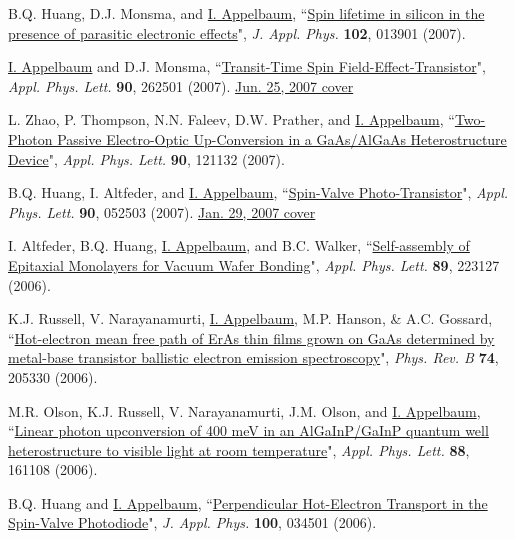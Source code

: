 \documentclass[paper=letter,fontsize=11pt]{scrartcl} %
\newcommand{\PaperEntry}[7]{
		\noindent #1, ``\href{#7}{#2}", \textit{#3} \textbf{#4}, #5 (#6).}
\begin{document}
\begin{etaremune}
\item\PaperEntry{B.Q. Huang, D.J. Monsma, and \underline{I. Appelbaum}}{Spin lifetime in silicon in the presence of parasitic electronic effects}{J. Appl. Phys.}{102}{013901}{2007}{http://dx.doi.org/10.1063/1.2750411}

\item\PaperEntry{\underline{I. Appelbaum} and D.J. Monsma}{Transit-Time Spin Field-Effect-Transistor}{Appl. Phys. Lett.}{90}{262501}{2007}{http://dx.doi.org/10.1063/1.2752015} \href{http://scitation.aip.org/apl/covers/90_26.jsp}{Jun. 25, 2007 cover}

\item\PaperEntry{L. Zhao, P. Thompson, N.N. Faleev, D.W. Prather, and \underline{I. Appelbaum}}{Two-Photon Passive Electro-Optic Up-Conversion in a GaAs/AlGaAs Heterostructure Device}{Appl. Phys. Lett.}{90}{121132}{2007}{http://dx.doi.org/10.1063/1.2716354}

\item\PaperEntry{B.Q. Huang, I. Altfeder, and \underline{I. Appelbaum}}{Spin-Valve Photo-Transistor}{Appl. Phys. Lett.}{90}{052503}{2007}{http://dx.doi.org/10.1063/1.2436715} \href{http://scitation.aip.org/apl/covers/90_5.jsp}{Jan. 29, 2007 cover} 

\item\PaperEntry{I. Altfeder, B.Q. Huang, \underline{I. Appelbaum}, and B.C. Walker}{Self-assembly of Epitaxial Monolayers for Vacuum Wafer Bonding}{Appl. Phys. Lett.}{89}{223127}{2006}{http://dx.doi.org/10.1063/1.2399358}

\item\PaperEntry{K.J. Russell, V. Narayanamurti, \underline{I. Appelbaum}, M.P. Hanson, \& A.C. Gossard}{Hot-electron mean free path of ErAs thin films grown on GaAs determined by metal-base transistor ballistic electron emission spectroscopy}{Phys. Rev. B}{74}{205330}{2006}{http://dx.doi.org/10.1103/PhysRevB.74.205330}

\item\PaperEntry{M.R. Olson, K.J. Russell, V. Narayanamurti, J.M. Olson, and \underline{I. Appelbaum}}{Linear photon upconversion of 400 meV in an AlGaInP/GaInP quantum well heterostructure to visible light at room temperature}{Appl. Phys. Lett.}{88}{161108}{2006}{http://dx.doi.org/10.1063/1.2195094}

\item\PaperEntry{B.Q. Huang and \underline{I. Appelbaum}}{Perpendicular Hot-Electron Transport in the Spin-Valve Photodiode}{J. Appl. Phys.}{100}{034501}{2006}{http://dx.doi.org/10.1063/1.2220643}


\end{etaremune}
\end{document}
